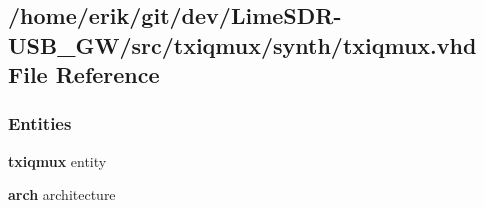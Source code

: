 \subsection{/home/erik/git/dev/\+Lime\+S\+D\+R-\/\+U\+S\+B\+\_\+\+G\+W/src/txiqmux/synth/txiqmux.vhd File Reference}
\label{txiqmux_8vhd}
\subsubsection*{Entities}
\begin{DoxyCompactItemize}
\item 
{\bf txiqmux} entity
\item 
{\bf arch} architecture
\end{DoxyCompactItemize}
